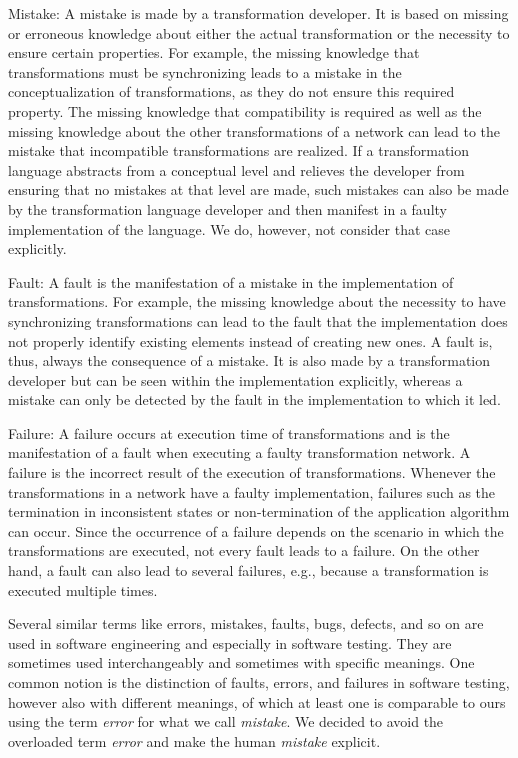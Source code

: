 \begin{properdescription}
    \item[Mistake:] 
    A mistake is made by a transformation developer. It is based on missing or erroneous knowledge about either the actual transformation or the necessity to ensure certain properties. For example, the missing knowledge that transformations must be synchronizing leads to a mistake in the conceptualization of transformations, as they do not ensure this required property. The missing knowledge that compatibility is required as well as the missing knowledge about the other transformations of a network can lead to the mistake that incompatible transformations are realized.
    If a transformation language abstracts from a conceptual level and relieves the developer from ensuring that no mistakes at that level are made, such mistakes can also be made by the transformation language developer and then manifest in a faulty implementation of the language. We do, however, not consider that case explicitly. 
    \item[Fault:] 
    A fault is the manifestation of a mistake in the implementation of transformations. For example, the missing knowledge about the necessity to have synchronizing transformations can lead to the fault that the implementation does not properly identify existing elements instead of creating new ones. A fault is, thus, always the consequence of a mistake. It is also made by a transformation developer but can be seen within the implementation explicitly, whereas a mistake can only be detected by the fault in the implementation to which it led.
    \item[Failure:] 
    A failure occurs at execution time of transformations and is the manifestation of a fault when executing a faulty transformation network. A failure is the incorrect result of the execution of transformations. Whenever the transformations in a network have a faulty implementation, failures such as the termination in inconsistent states or non-termination of the application algorithm can occur. Since the occurrence of a failure depends on the scenario in which the transformations are executed, not every fault leads to a failure. On the other hand, a fault can also lead to several failures, e.g., because a transformation is executed multiple times.
\end{properdescription}

Several similar terms like errors, mistakes, faults, bugs, defects, and so on are used in software engineering and especially in software testing.
They are sometimes used interchangeably and sometimes with specific meanings.
One common notion is the distinction of faults, errors, and failures in software testing, however also with different meanings, of which at least one is comparable to ours using the term \emph{error} for what we call \emph{mistake}.
We decided to avoid the overloaded term \emph{error} and make the human \emph{mistake} explicit.


